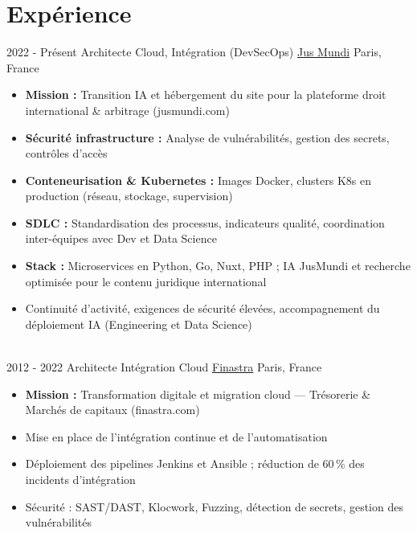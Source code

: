 \documentclass[letterpaper]{twentysecondcv} %
\begin{document}
\makeprofile %


\section{Expérience}

\begin{twentytimeline}
	\twentyitemtimeline{\faCloud}
		{2022 -}
		{Présent}
		{Architecte Cloud, Intégration (DevSecOps)}
		{\href{https://www.jusmundi.com}{Jus Mundi}}
		{Paris, France}
		{\begin{itemize}
		\item \textbf{Mission :} Transition IA et hébergement du site pour la plateforme droit international \& arbitrage (jusmundi.com)
		\item \textbf{Sécurité infrastructure :} Analyse de vulnérabilités, gestion des secrets, contrôles d'accès
		\item \textbf{Conteneurisation \& Kubernetes :} Images Docker, clusters K8s en production (réseau, stockage, supervision)
		\item \textbf{SDLC :} Standardisation des processus, indicateurs qualité, coordination inter-équipes avec Dev et Data Science
		\item \textbf{Stack :} Microservices en Python, Go, Nuxt, PHP ; IA JusMundi et recherche optimisée pour le contenu juridique international
		\item Continuité d'activité, exigences de sécurité élevées, accompagnement du déploiement IA (Engineering et Data Science)
		\end{itemize}}
	\\
	\twentyitemtimeline{\faUsers}
		{2012 -}
		{2022}
		{Architecte Intégration Cloud}
		{\href{https://finastra.com}{Finastra}}
		{Paris, France}
		{\begin{itemize}
		\item \textbf{Mission :} Transformation digitale et migration cloud — Trésorerie \& Marchés de capitaux (finastra.com)
		\item Mise en place de l'intégration continue et de l'automatisation
		\item Déploiement des pipelines Jenkins et Ansible ; réduction de 60\,\% des incidents d'intégration
		\item Sécurité : SAST/DAST, Klocwork, Fuzzing, détection de secrets, gestion des vulnérabilités

\end{itemize}}
\end{twentytimeline}
\end{document}
